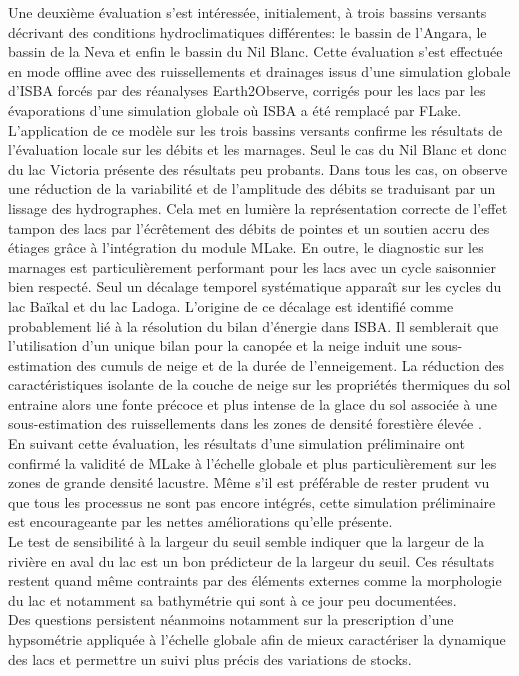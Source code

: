Une deuxième évaluation s'est intéressée, initialement, à trois bassins versants décrivant des conditions hydroclimatiques différentes: le bassin de l'Angara, le bassin de la Neva et enfin le bassin du Nil Blanc. Cette évaluation s'est effectuée en mode offline avec des ruissellements et drainages issus d'une simulation globale d'ISBA forcés par des réanalyses Earth2Observe, corrigés pour les lacs par les évaporations d'une simulation globale où ISBA a été remplacé par FLake. L'application de ce modèle sur les trois bassins versants confirme les résultats de l'évaluation locale sur les débits et les marnages. Seul le cas du Nil Blanc et donc du lac Victoria présente des résultats peu probants. Dans tous les cas, on observe une réduction de la variabilité et de l'amplitude des débits se traduisant par un lissage des hydrographes. Cela met en lumière la représentation correcte de l'effet tampon des lacs par l'écrêtement des débits de pointes et un soutien accru des étiages grâce à l'intégration du module MLake. En outre, le diagnostic sur les marnages est particulièrement performant pour les lacs avec un cycle saisonnier bien respecté. Seul un décalage temporel systématique apparaît sur les cycles du lac Baïkal et du lac Ladoga. L'origine de ce décalage est identifié comme probablement lié à la résolution du bilan d'énergie dans ISBA. Il semblerait que l'utilisation d'un unique bilan pour la canopée et la neige induit une sous-estimation des cumuls de neige et de la durée de l'enneigement. La réduction des caractéristiques isolante de la couche de neige sur les propriétés thermiques du sol entraine alors une fonte précoce et plus intense de la glace du sol associée à une sous-estimation des ruissellements dans les zones de densité forestière élevée \citep{napoly2020}.\\
En suivant cette évaluation, les résultats d'une simulation préliminaire ont confirmé la validité de MLake à l'échelle globale et plus particulièrement sur les zones de grande densité lacustre. Même s'il est préférable de rester prudent vu que tous les processus ne sont pas encore intégrés, cette simulation préliminaire est encourageante par les nettes améliorations qu'elle présente.\\
Le test de sensibilité à la largeur du seuil semble indiquer que la largeur de la rivière en aval du lac est un bon prédicteur de la largeur du seuil. Ces résultats restent quand même contraints par des éléments externes comme la morphologie du lac et notamment sa bathymétrie qui sont à ce jour peu documentées.\\
Des questions persistent néanmoins notamment sur la prescription d'une hypsométrie appliquée à l'échelle globale afin de mieux caractériser la dynamique des lacs et permettre un suivi plus précis des variations de stocks.\\


